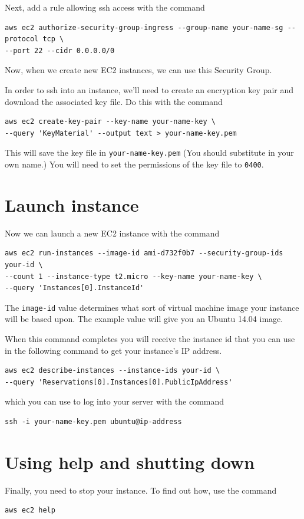 \documentclass{article}
\begin{document}
Next, add a rule allowing ssh access with the command

\begin{verbatim}
aws ec2 authorize-security-group-ingress --group-name your-name-sg --protocol tcp \
--port 22 --cidr 0.0.0.0/0
\end{verbatim}

Now, when we create new EC2 instances, we can use this Security Group.

In order to ssh into an instance, we'll need to create an encryption key pair and download the associated key file. Do this with the command

\begin{verbatim}
aws ec2 create-key-pair --key-name your-name-key \
--query 'KeyMaterial' --output text > your-name-key.pem
\end{verbatim}

This will save the key file in \texttt{your-name-key.pem} (You should substitute in your own name.) You will need to set the permissions of the key file to \texttt{0400}.

\section{Launch instance}
Now we can launch a new EC2 instance with the command

\begin{verbatim}
aws ec2 run-instances --image-id ami-d732f0b7 --security-group-ids your-id \
--count 1 --instance-type t2.micro --key-name your-name-key \
--query 'Instances[0].InstanceId'
\end{verbatim}

The \texttt{image-id} value determines what sort of virtual machine image your instance will be based upon.  The example value will give you an Ubuntu 14.04 image.

When this command completes you will receive the instance id that you can use in the following command to get your instance's IP address.

\begin{verbatim}
aws ec2 describe-instances --instance-ids your-id \
--query 'Reservations[0].Instances[0].PublicIpAddress'
\end{verbatim}

which you can use to log into your server with the command

\begin{verbatim}
ssh -i your-name-key.pem ubuntu@ip-address
\end{verbatim}

\section{Using help and shutting down}
Finally, you need to stop your instance.  To find out how, use the command

\begin{verbatim}
aws ec2 help 
\end{verbatim}
\end{document}
